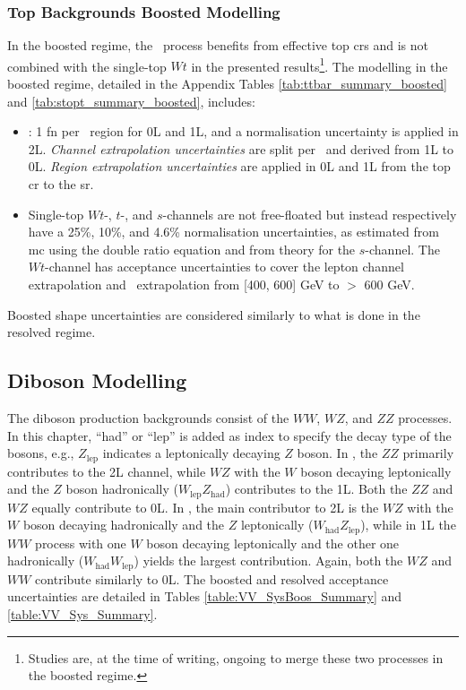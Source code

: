 \subsubsection{Top Backgrounds Boosted Modelling} 
In the boosted regime, the \ttb\ process benefits from effective top \glspl{cr} and is not combined with the single-top $Wt$ in the presented results\footnote{Studies are, at the time of writing, ongoing to merge these two processes in the boosted regime.}. The modelling in the boosted regime, detailed in the Appendix Tables \ref{tab:ttbar_summary_boosted} and \ref{tab:stopt_summary_boosted}, includes:
\begin{itemize}[leftmargin=*]
    \item \ttb: 1 \gls{fn} per \ptv\ region for 0L and 1L, and a normalisation uncertainty is applied in 2L. \textit{Channel extrapolation uncertainties} are split per \ptv\ and derived from 1L to 0L. \textit{Region extrapolation uncertainties} are applied in 0L and 1L from the top \gls{cr} to the \gls{sr}.
    \item Single-top $Wt$-, $t$-, and $s$-channels are not free-floated but instead respectively have a 25\%, 10\%, and 4.6\% normalisation uncertainties, as estimated from \gls{mc} using the double ratio equation and from theory for the $s$-channel. The $Wt$-channel has acceptance uncertainties to cover the lepton channel extrapolation and \ptv\ extrapolation from [400, 600] GeV to $>$ 600 GeV. 
\end{itemize}
Boosted shape uncertainties are considered similarly to what is done in the resolved regime.

\subsection{Diboson Modelling}
The diboson production backgrounds consist of the $WW$, $WZ$, and $ZZ$ processes. In this chapter, ``had'' or ``lep'' is added as index to specify the decay type of the bosons, e.g., $Z_{\text{lep}}$ indicates a leptonically decaying $Z$ boson. In \vhb, the $ZZ$ primarily contributes to the 2L channel, while $WZ$ with the $W$ boson decaying leptonically and the $Z$ boson hadronically ($W_{\text{lep}}Z_{\text{had}}$) contributes to the 1L. Both the $ZZ$ and $WZ$ equally contribute to 0L. In \vhc, the main contributor to 2L is the $WZ$ with the $W$ boson decaying hadronically and the $Z$ leptonically ($W_{\text{had}}Z_{\text{lep}}$), while in 1L the $WW$ process with one $W$ boson decaying leptonically and the other one hadronically ($W_{\text{had}}W_{\text{lep}}$) yields the largest contribution. Again, both the $WZ$ and $WW$ contribute similarly to 0L. The boosted and resolved acceptance uncertainties are detailed in Tables \ref{table:VV_SysBoos_Summary} and \ref{table:VV_Sys_Summary}. \\

